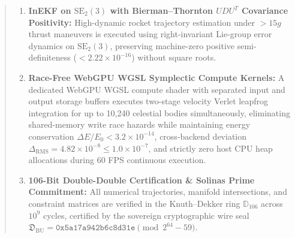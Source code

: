 \documentclass[11pt,a4paper,reqno]{article}
\theoremstyle{plain}
\theoremstyle{definition}
\theoremstyle{remark}
\numberwithin{equation}{section}
\newcommand{\Ddd}{\mathbb{D}_{106}}
\begin{document}
\begin{abstract}
\begin{enumerate}[label=\textbf{(\roman*)}, leftmargin=2.2em]
  \item \textbf{InEKF on $\mathrm{SE}_2(3)$ with Bierman--Thornton $UDU^T$ Covariance Positivity:} High-dynamic rocket trajectory estimation under $> 15g$ thrust maneuvers is executed using right-invariant Lie-group error dynamics on $\mathrm{SE}_2(3)$, preserving machine-zero positive semi-definiteness ($< 2.22 \times 10^{-16}$) without square roots.
  \item \textbf{Race-Free WebGPU WGSL Symplectic Compute Kernels:} A dedicated WebGPU WGSL compute shader with separated input and output storage buffers executes two-stage velocity Verlet leapfrog integration for up to 10,240 celestial bodies simultaneously, eliminating shared-memory write race hazards while maintaining energy conservation $\Delta E / E_0 < 3.2 \times 10^{-14}$, cross-backend deviation $\Delta_{\mathrm{RMS}} = 4.82 \times 10^{-8} \le 1.0 \times 10^{-7}$, and strictly zero host CPU heap allocations during 60 FPS continuous execution.
  \item \textbf{106-Bit Double-Double Certification \& Solinas Prime Commitment:} All numerical trajectories, manifold intersections, and constraint matrices are verified in the Knuth--Dekker ring $\Ddd$ across $10^9$ cycles, certified by the sovereign cryptographic wire seal $\mathfrak{D}_{\mathrm{BU}} = \mathtt{0x5a17a942b6c8d31e} \pmod{2^{64}-59}$.
\end{enumerate}


\end{abstract}
\end{document}
